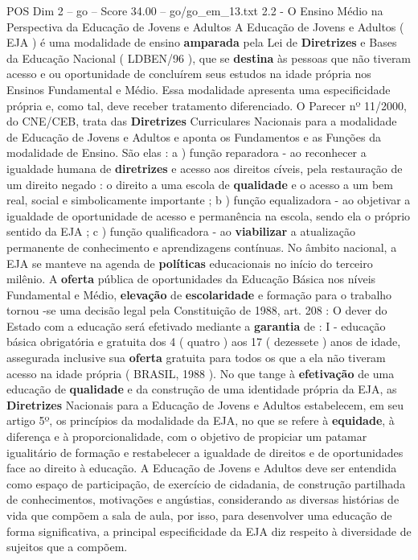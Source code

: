 \begin{textsample}{POS Dim 2 – go – Score 34.00 – go/go\_em\_13.txt}  \label{ex:f2_pos_172}
2.2 - O Ensino Médio na Perspectiva da Educação de Jovens e Adultos A Educação de Jovens e Adultos ( EJA ) é uma modalidade de ensino \textbf{amparada} pela Lei de \textbf{Diretrizes} e Bases da Educação Nacional ( LDBEN/96 ), que se \textbf{destina} às pessoas que não tiveram acesso e ou oportunidade de concluírem seus estudos na idade própria nos Ensinos Fundamental e Médio.
Essa modalidade apresenta uma especificidade própria e, como tal, deve receber tratamento diferenciado.
O Parecer nº 11/2000, do CNE/CEB, trata das \textbf{Diretrizes} Curriculares Nacionais para a modalidade de Educação de Jovens e Adultos e aponta os Fundamentos e as Funções da modalidade de Ensino.
São elas : a ) função reparadora - ao reconhecer a igualdade humana de \textbf{diretrizes} e acesso aos direitos cíveis, pela restauração de um direito negado : o direito a uma escola de \textbf{qualidade} e o acesso a um bem real, social e simbolicamente importante ; b ) função equalizadora - ao objetivar a igualdade de oportunidade de acesso e permanência na escola, sendo ela o próprio sentido da EJA ; c ) função qualificadora - ao \textbf{viabilizar} a atualização permanente de conhecimento e aprendizagens contínuas.
No âmbito nacional, a EJA se manteve na agenda de \textbf{políticas} educacionais no início do terceiro milênio.
A \textbf{oferta} pública de oportunidades da Educação Básica nos níveis Fundamental e Médio, \textbf{elevação} de \textbf{escolaridade} e formação para o trabalho tornou -se uma decisão legal pela Constituição de 1988, art. 208 : O dever do Estado com a educação será efetivado mediante a \textbf{garantia} de : I - educação básica obrigatória e gratuita dos 4 ( quatro ) aos 17 ( dezessete ) anos de idade, assegurada inclusive sua \textbf{oferta} gratuita para todos os que a ela não tiveram acesso na idade própria ( BRASIL, 1988 ).
No que tange à \textbf{efetivação} de uma educação de \textbf{qualidade} e da construção de uma identidade própria da EJA, as \textbf{Diretrizes} Nacionais para a Educação de Jovens e Adultos estabelecem, em seu artigo 5º, os princípios da modalidade da EJA, no que se refere à \textbf{equidade}, à diferença e à proporcionalidade, com o objetivo de propiciar um patamar igualitário de formação e restabelecer a igualdade de direitos e de oportunidades face ao direito à educação.
A Educação de Jovens e Adultos deve ser entendida como espaço de participação, de exercício de cidadania, de construção partilhada de conhecimentos, motivações e angústias, considerando as diversas histórias de vida que compõem a sala de aula, por isso, para desenvolver uma educação de forma significativa, a principal especificidade da EJA diz respeito à diversidade de sujeitos que a compõem.

\end{textsample}
